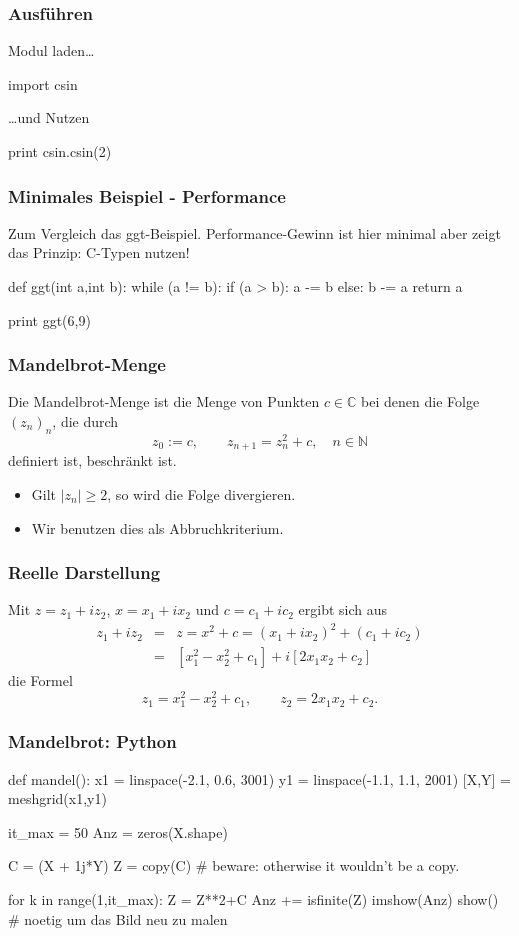\documentclass[hyperref={xetex}]{beamer}
\begin{document}
\begin{frame}[fragile]\frametitle{Ausführen}
Modul laden\ldots
  \begin{pyin}
    import csin
  \end{pyin}
\ldots und Nutzen
  \begin{pyin}
    print csin.csin(2)
  \end{pyin}
\end{frame}

\begin{frame}[fragile]\frametitle{Minimales Beispiel - Performance}
Zum Vergleich das ggt-Beispiel. Performance-Gewinn ist hier minimal aber zeigt das Prinzip: C-Typen nutzen!
  \begin{pyin}
def ggt(int a,int b):
    while (a != b):
        if (a > b):
            a -= b
        else:
            b -= a
    return a

print ggt(6,9)    
  \end{pyin}
\end{frame}

\begin{frame}[fragile]\frametitle{Mandelbrot-Menge}
Die Mandelbrot-Menge ist die Menge von Punkten $c \in \mathbb{C}$
bei denen die Folge $(z_n)_n$, die durch
\[ z_0:=c, \qquad  z_{n+1} = z_n^2 +c, \quad n \in \mathbb{N}\]
definiert ist, beschr\"ankt ist.
\begin{itemize}
\item Gilt $|z_n| \geq 2$, so wird die Folge divergieren.
\item Wir benutzen dies als Abbruchkriterium.
\end{itemize}
\end{frame}
\begin{frame}[fragile]\frametitle{Reelle Darstellung}
Mit $z=z_1+iz_2$, $x=x_1+ix_2$ und $c=c_1+ic_2$ ergibt sich aus
\begin{eqnarray*}
z_1 + i z_2 & = & z  =  x^2 + c = (x_1+ix_2)^2 + (c_1+ic_2) \\
& = & [ x_1^2 -x_2^2 +c_1] + i[2 x_1 x_2 +c_2]
\end{eqnarray*}
die Formel
\[ z_1 = x_1^2 -x_2^2 +c_1, \qquad z_2 = 2 x_1 x_2 + c_2. \]
\end{frame}

\begin{frame}[fragile]\frametitle{Mandelbrot: Python}
  \begin{pyin}
def mandel():
    x1 = linspace(-2.1, 0.6, 3001)
    y1 = linspace(-1.1, 1.1, 2001)
    [X,Y] = meshgrid(x1,y1)

    it_max = 50
    Anz = zeros(X.shape)

    C = (X + 1j*Y)
    Z = copy(C) # beware: otherwise it wouldn't be a copy.

    for k in range(1,it_max):
        Z = Z**2+C
        Anz += isfinite(Z)
    imshow(Anz)
    show() # noetig um das Bild neu zu malen    
  \end{pyin}
\end{frame}
\end{document}
